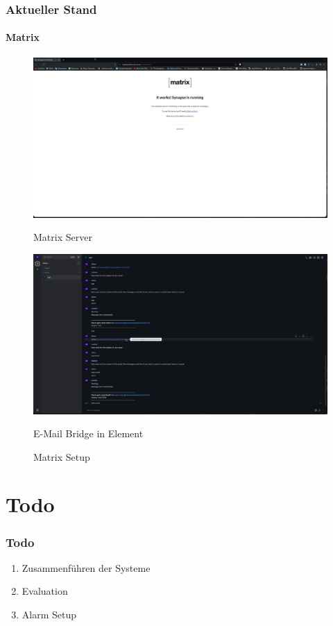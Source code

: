 \documentclass[]{beamer}
\begin{document}
\begin{frame}
	\frametitle{Aktueller Stand}
	\framesubtitle{Matrix}
	\begin{figure}
		\centering
		\begin{minipage}[t]{0.45\textwidth}
			\centering
			\includegraphics[width=\textwidth]{Images/Matrix_2.png}
			\caption*{Matrix Server}
		\end{minipage}
		\hfill
		\begin{minipage}[t]{0.45\textwidth}
			\centering
			\includegraphics[width=\textwidth]{Images/Matrix.png}
			\caption*{E-Mail Bridge in Element}
		\end{minipage}
		\hfill
		\caption{Matrix Setup}
		\label{fig:Matrix}
	\end{figure}
\end{frame}


\section{Todo}
\begin{frame}
	\frametitle{Todo}
	\begin{enumerate}
		\item Zusammenführen der Systeme
		\item Evaluation
		\item Alarm Setup
	\end{enumerate}
\end{frame}
\end{document}

